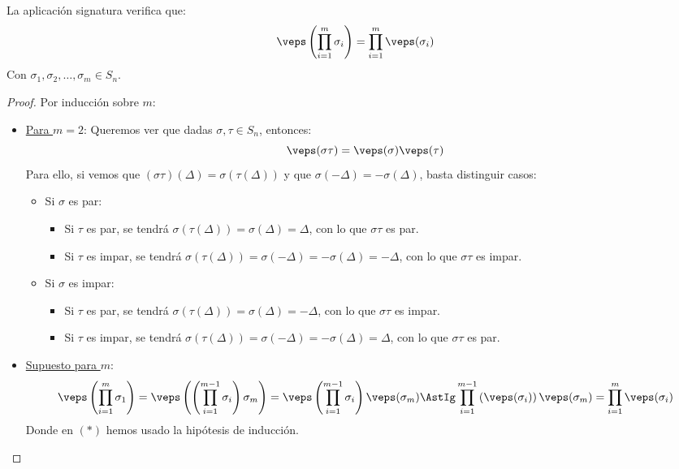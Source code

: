 \begin{prop}\label{prop:producto_signaturas}
    La aplicación signatura verifica que:
    \begin{equation*}
        \veps\left(\prod_{i=1}^{m}\sigma_i\right) = \prod_{i=1}^{m} \veps(\sigma_i)
    \end{equation*}
    Con $\sigma_1,\sigma_2,\ldots,\sigma_m\in S_n$.
    \begin{proof}
        Por inducción sobre $m$:
        \begin{itemize}
            \item \underline{Para $m=2$}: Queremos ver que dadas $\sigma,\tau\in S_n$, entonces:
                \begin{equation*}
                    \veps(\sigma\tau) = \veps(\sigma)\veps(\tau)
                \end{equation*}
                Para ello, si vemos que $(\sigma\tau)(\Delta) = \sigma(\tau(\Delta))$ y que $\sigma(-\Delta) = -\sigma(\Delta)$,
            basta distinguir casos:
            \begin{itemize}
                \item Si $\sigma$ es par:
                    \begin{itemize}
                        \item Si $\tau$ es par, se tendrá $\sigma(\tau(\Delta)) = \sigma(\Delta)=\Delta$, con lo que $\sigma\tau$ es par.
                        \item Si $\tau$ es impar, se tendrá $\sigma(\tau(\Delta)) = \sigma(-\Delta)=-\sigma(\Delta)=-\Delta$, con lo que $\sigma\tau$ es impar.
                    \end{itemize}
                \item Si $\sigma$ es impar:
                    \begin{itemize}
                        \item Si $\tau$ es par, se tendrá $\sigma(\tau(\Delta)) = \sigma(\Delta) = -\Delta$, con lo que $\sigma\tau$ es impar.
                        \item Si $\tau$ es impar, se tendrá $\sigma(\tau(\Delta)) = \sigma(-\Delta)=-\sigma(\Delta)=\Delta$, con lo que $\sigma\tau$ es par.
                    \end{itemize}
            \end{itemize}
            \item \underline{Supuesto para $m$}:
                \begin{equation*}
                    \veps\left(\prod_{i=1}^{m}\sigma_1\right) = \veps\left(\left(\prod_{i=1}^{m-1}\sigma_i\right)\sigma_m\right) = \veps\left(\prod_{i=1}^{m-1}\sigma_i\right)\veps(\sigma_m) \AstIg \prod_{i=1}^{m-1}\left(\veps(\sigma_i)\right)\veps(\sigma_m) = \prod_{i=1}^{m}\veps(\sigma_i)
                \end{equation*}
                Donde en $(\ast)$ hemos usado la hipótesis de inducción.
        \end{itemize}
    \end{proof}
\end{prop}

